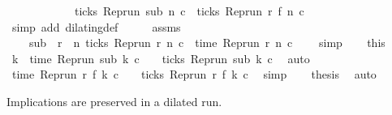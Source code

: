 \begin{isabellebody}
\ \ \ \ \ \ \ \ \ \ \ {\isasymand}\ ticks\ {\isacharparenleft}{\isacharparenleft}Rep{\isacharunderscore}run\ sub{\isacharparenright}\ n\ c{\isacharparenright}\ {\isacharequal}\ ticks\ {\isacharparenleft}{\isacharparenleft}Rep{\isacharunderscore}run\ r{\isacharparenright}\ {\isacharparenleft}f\ n{\isacharparenright}\ c{\isacharparenright}{\isacartoucheclose}\ \isamarkupfalse%
\ {\isacharparenleft}simp\ add{\isacharcolon}\ dilating{\isacharunderscore}def{\isacharparenright}\isanewline
\ \ \isamarkupfalse%
\ \isamarkupfalse%
\ assms{\isacharparenleft}{}{\isacharparenright}\ \isamarkupfalse%
\isanewline
\ \ \ \ {\isacartoucheopen}sub\ {\isasymin}\ {\isacharbraceleft}r{\isachardot}\ {\isasymexists}\ n{\isachardot}\ ticks\ {\isacharparenleft}{\isacharparenleft}Rep{\isacharunderscore}run\ r{\isacharparenright}\ n\ c{\isacharparenright}\ {\isasymand}\ time\ {\isacharparenleft}{\isacharparenleft}Rep{\isacharunderscore}run\ r{\isacharparenright}\ n\ c{\isacharprime}{\isacharparenright}\ {\isacharequal}\ {\isasymtau}{\isacharbraceright}{\isacartoucheclose}\ \isamarkupfalse%
\ simp\isanewline
\ \ \isamarkupfalse%
\ this\ \isamarkupfalse%
\ k\ \ {\isacartoucheopen}time\ {\isacharparenleft}{\isacharparenleft}Rep{\isacharunderscore}run\ sub{\isacharparenright}\ k\ c{\isacharprime}{\isacharparenright}\ {\isacharequal}\ {\isasymtau}\ {\isasymand}\ ticks\ {\isacharparenleft}{\isacharparenleft}Rep{\isacharunderscore}run\ sub{\isacharparenright}\ k\ c{\isacharparenright}{\isacartoucheclose}\ \isamarkupfalse%
\ auto\isanewline
\ \ \isamarkupfalse%
\ \isamarkupfalse%
\ {\isacartoucheopen}time\ {\isacharparenleft}{\isacharparenleft}Rep{\isacharunderscore}run\ r{\isacharparenright}\ {\isacharparenleft}f\ k{\isacharparenright}\ c{\isacharprime}{\isacharparenright}\ {\isacharequal}\ {\isasymtau}\ {\isasymand}\ ticks\ {\isacharparenleft}{\isacharparenleft}Rep{\isacharunderscore}run\ r{\isacharparenright}\ {\isacharparenleft}f\ k{\isacharparenright}\ c{\isacharparenright}{\isacartoucheclose}\ \isamarkupfalse%
\ simp\isanewline
\ \ \isamarkupfalse%
\ {\isacharquery}thesis\ \isamarkupfalse%
\ auto\isanewline
{}\isamarkupfalse%
%
\endisatagproof
{\isafoldproof}%
%
\isadelimproof
%
\endisadelimproof
%
\begin{isamarkuptext}%
Implications are preserved in a dilated run.%
\end{isamarkuptext}\isamarkuptrue%

\end{isabellebody}
